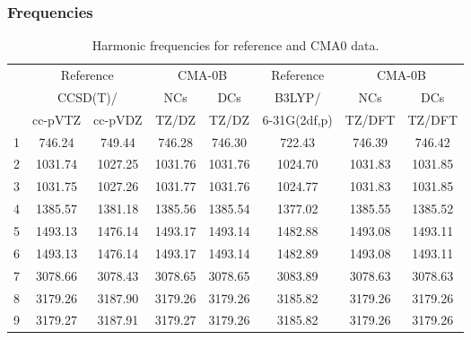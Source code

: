 \documentclass[10pt,oneside]{article}
\begin{document}
\clearpage

\subsubsection*{Frequencies}
\begin{table}[h!]
\centering
\caption{Harmonic frequencies for reference and CMA0 data.}
\begin{tabular}{cccccccc}
\toprule
{} & \multicolumn{2}{c}{Reference} & \multicolumn{2}{c}{CMA-0B} &    Reference & \multicolumn{2}{c}{CMA-0B} \\
{} & \multicolumn{2}{c}{CCSD(T)/} &     NCs &     DCs &       B3LYP/ &     NCs &     DCs \\
{} &   cc-pVTZ & cc-pVDZ &   TZ/DZ &   TZ/DZ & 6-31G(2df,p) &  TZ/DFT &  TZ/DFT \\
\midrule
1 &    746.24 &  749.44 &  746.28 &  746.30 &       722.43 &  746.39 &  746.42 \\
2 &   1031.74 & 1027.25 & 1031.76 & 1031.76 &      1024.70 & 1031.83 & 1031.85 \\
3 &   1031.75 & 1027.26 & 1031.77 & 1031.76 &      1024.77 & 1031.83 & 1031.85 \\
4 &   1385.57 & 1381.18 & 1385.56 & 1385.54 &      1377.02 & 1385.55 & 1385.52 \\
5 &   1493.13 & 1476.14 & 1493.17 & 1493.14 &      1482.88 & 1493.08 & 1493.11 \\
6 &   1493.13 & 1476.14 & 1493.17 & 1493.14 &      1482.89 & 1493.08 & 1493.11 \\
7 &   3078.66 & 3078.43 & 3078.65 & 3078.65 &      3083.89 & 3078.63 & 3078.63 \\
8 &   3179.26 & 3187.90 & 3179.26 & 3179.26 &      3185.82 & 3179.26 & 3179.26 \\
9 &   3179.27 & 3187.91 & 3179.27 & 3179.26 &      3185.82 & 3179.26 & 3179.26 \\
\bottomrule
\end{tabular}
\end{table}

\clearpage
\end{document}
